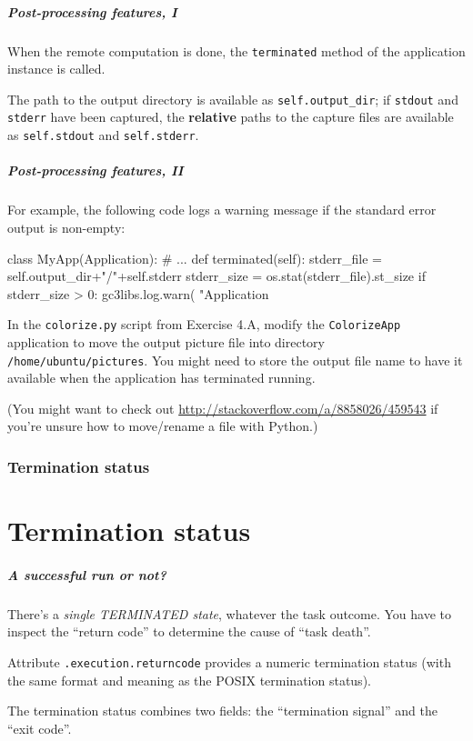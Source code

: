 \documentclass[english,serif,mathserif,xcolor=pdftex,dvipsnames,table]{beamer}
\begin{document}
\begin{frame}[fragile]
  \frametitle{Post-processing features, I}

  When the remote computation is done, the \texttt{terminated} method
  of the application instance is called.

  \+
  The path to the output directory is available as
  \lstinline|self.output_dir|; if \texttt{stdout} and \texttt{stderr}
  have been captured, the \textbf{relative} paths to the capture files
  are available as \lstinline|self.stdout| and
  \lstinline|self.stderr|.
\end{frame}


\begin{frame}[fragile]
  \frametitle{Post-processing features, II}

  For example, the following code logs a warning message if the
  standard error output is non-empty:
\begin{python}
class MyApp(Application):
  # ...
  def terminated(self):
    stderr_file = self.output_dir+"/"+self.stderr
    stderr_size = os.stat(stderr_file).st_size
    if stderr_size > 0:
      gc3libs.log.warn(
        "Application %
\end{python}
\end{frame}


\begin{frame}
  \begin{exercise*}[6.A]

    In the \texttt{colorize.py} script from Exercise 4.A, modify the
    \texttt{ColorizeApp} application to move the output picture file
    into directory \texttt{/home/ubuntu/pictures}.  You might need to
    store the output file name to have it available when the
    application has terminated running.

    \+
    (You might want to check out
    \url{http://stackoverflow.com/a/8858026/459543} if you're unsure
    how to move/rename a file with Python.)
  \end{exercise*}
\end{frame}


\section{Termination status}
\part{Termination status}

\begin{frame}[fragile]
  \frametitle{A successful run or not?}

  There's a \emph{single TERMINATED state}, whatever the task outcome.
  You have to inspect the ``return code'' to determine the
  cause of ``task death''.

  \+
  Attribute \lstinline|.execution.returncode| provides a numeric termination
  status (with the same format and meaning as the POSIX termination
  status).

  \+
  The termination status combines two fields: the ``termination
  signal'' and the ``exit code''.

\end{frame}
\end{document}
